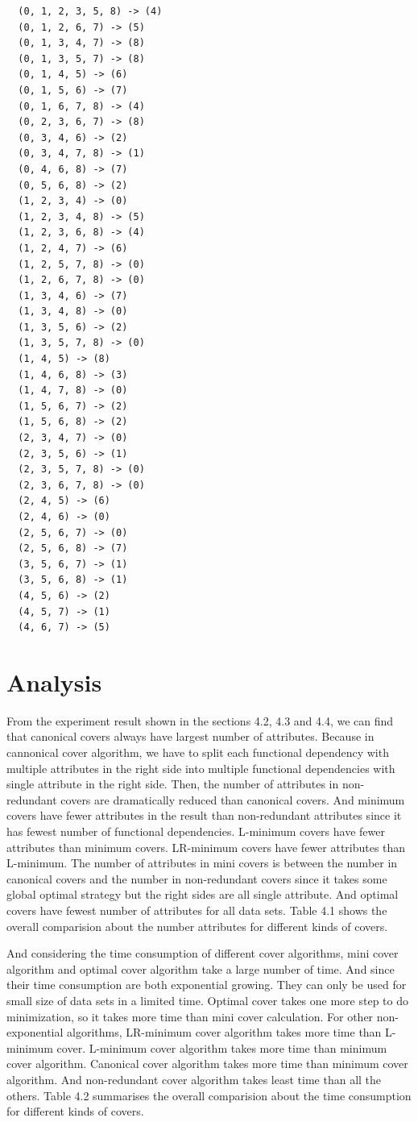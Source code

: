 \documentclass[11pt]{book}
\begin{document}
\begin{verbatim}
  (0, 1, 2, 3, 5, 8) -> (4)
  (0, 1, 2, 6, 7) -> (5)
  (0, 1, 3, 4, 7) -> (8)
  (0, 1, 3, 5, 7) -> (8)
  (0, 1, 4, 5) -> (6)
  (0, 1, 5, 6) -> (7)
  (0, 1, 6, 7, 8) -> (4)
  (0, 2, 3, 6, 7) -> (8)
  (0, 3, 4, 6) -> (2)
  (0, 3, 4, 7, 8) -> (1)
  (0, 4, 6, 8) -> (7)
  (0, 5, 6, 8) -> (2)
  (1, 2, 3, 4) -> (0)
  (1, 2, 3, 4, 8) -> (5)
  (1, 2, 3, 6, 8) -> (4)
  (1, 2, 4, 7) -> (6)
  (1, 2, 5, 7, 8) -> (0)
  (1, 2, 6, 7, 8) -> (0)
  (1, 3, 4, 6) -> (7)
  (1, 3, 4, 8) -> (0)
  (1, 3, 5, 6) -> (2)
  (1, 3, 5, 7, 8) -> (0)
  (1, 4, 5) -> (8)
  (1, 4, 6, 8) -> (3)
  (1, 4, 7, 8) -> (0)
  (1, 5, 6, 7) -> (2)
  (1, 5, 6, 8) -> (2)
  (2, 3, 4, 7) -> (0)
  (2, 3, 5, 6) -> (1)
  (2, 3, 5, 7, 8) -> (0)
  (2, 3, 6, 7, 8) -> (0)
  (2, 4, 5) -> (6)
  (2, 4, 6) -> (0)
  (2, 5, 6, 7) -> (0)
  (2, 5, 6, 8) -> (7)
  (3, 5, 6, 7) -> (1)
  (3, 5, 6, 8) -> (1)
  (4, 5, 6) -> (2)
  (4, 5, 7) -> (1)
  (4, 6, 7) -> (5)
\end{verbatim}


\section{Analysis}

From the experiment result shown in the sections 4.2, 4.3 and 4.4, we can find that canonical covers always have largest number of attributes. Because in cannonical cover algorithm, we have to split each functional dependency with multiple attributes in the right side into multiple functional dependencies with single attribute in the right side. Then,
the number of attributes in non-redundant covers are dramatically reduced than canonical covers. And minimum covers have fewer attributes in the result than non-redundant attributes since it has fewest number of functional dependencies. L-minimum covers have fewer attributes than minimum covers. LR-minimum covers have fewer attributes than L-minimum. The number of attributes in mini covers is between  the number in canonical covers and the number in non-redundant covers since it takes some global optimal strategy but the right sides are all single attribute. And optimal covers have fewest number of attributes for all data sets. Table 4.1 shows the overall comparision about the number attributes for different kinds of covers.

And considering the time consumption of different cover algorithms, mini cover algorithm and optimal cover algorithm take a large number of time. And since their time consumption are both exponential growing. They can only be used for small size of data sets in a limited time. Optimal cover takes one more step to do minimization, so it takes more time than mini cover calculation. For other non-exponential algorithms, LR-minimum cover algorithm takes more time than L-minimum cover. L-minimum cover algorithm takes more time than minimum cover algorithm. Canonical cover algorithm takes more time than minimum cover algorithm. And non-redundant cover algorithm takes least time than all the others. Table 4.2 summarises the overall comparision about the time consumption for different kinds of covers.
\end{document}

